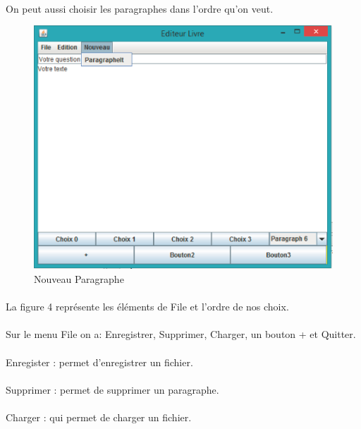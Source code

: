 \documentclass[12pt,a4paper]{article}
\begin{document}
\paragraph{}On peut aussi choisir les paragraphes dans l'ordre qu'on veut. 
 \begin{figure}[ht]
  \begin{center}
    \includegraphics[width=1.1\textwidth]{./images/edit2.png} 
  \end{center}
  \caption{Nouveau Paragraphe}
  \label{fig:mon_image}
\end{figure}
\newpage
\paragraph{}La figure 4 représente les éléments de File et l'ordre de nos choix.
\paragraph{}Sur le menu File on a: Enregistrer, Supprimer, Charger, un bouton + et Quitter.
\paragraph{}Enregister : permet d'enregistrer un fichier.
\paragraph{}Supprimer : permet de supprimer un paragraphe.
\paragraph{}Charger : qui permet de charger un fichier.
\end{document}
